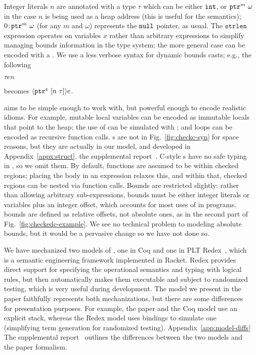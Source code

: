 Integer literals $n$ are annotated with a type $\tau$ which can be either
$\mathtt{int}$, or $\mathtt{ptr}^{m}~{\omega}$ in the case $n$ is being used as
a heap address (this is useful for the semantics);
${0}\!:\!{\mathtt{ptr}^{m}~{\omega}}$ (for any $m$ and $\omega$) represents
the $\mathtt{null}$ pointer, as usual. 
The
$\texttt{strlen}$ expression operates on variables $x$
rather than arbitrary expressions to simplify managing
bounds information in the type system; the more general case can be
encoded with a . We use a less verbose syntax for dynamic bounds
casts; e.g., the following %

$\tau$\code{>>(}$e$$n$\code{))}

\noindent
becomes $\langle{\ensuremath{\mathtt{ptr}^{\texttt{c}}~{[{n}~{\tau}]}}}\rangle{e}$. 

\lang aims to be simple enough to work with, but powerful enough to
encode realistic \checkedc idioms. For example, mutable local
variables can be encoded as immutable locals that point to the heap;
the use of \code{&} can be simulated with ;
and loops can be encoded as recursive function calls. s are
not in Fig.~\ref{fig:checkc-syn} for space reasons, but they are
actually in our model, and developed in
\iftr
Appendix~\ref{appx:struct}.
\else
the supplemental report~\cite{checkedc-tech-report}.
\fi
C-style s have no safe typing
in \checkedc, so we omit them. By default, functions are assumed to
be within checked regions; placing the body in an 
expression relaxes this, and within that, checked regions can be
nested via function calls. Bounds are restricted slightly:
rather than allowing arbitrary sub-expressions, bounds must be either
integer literals or variables plus an integer offset, which accounts
for most uses of  in \checkedc programs. \lang bounds are
defined as relative offsets, not absolute ones, as in the second part
of Fig.~\ref{fig:checkedc-example}. We see no technical problem to
modeling absolute bounds, but it would be a pervasive change so we
have not done so.

  We have mechanized two models of \lang, one in Coq
  and one in PLT Redex~\cite{pltredex}, which is a semantic
  engineering framework implemented in Racket. Redex provides direct
  support for specifying the operational semantics and typing with logical
  rules, but then automatically makes them executable and subject to
  randomized testing, which is very useful during development.
  The model we present in the paper faithfully
  represents both mechanizations, but there are some differences for
  presentation purposes. For example, the paper and the Coq model use an explicit
  stack, whereas the Redex model uses  bindings to simulate
  one (simplifying term generation for randomized
  testing).
\iftr
  Appendix~\ref{app:model-diffs} 
\else
  The supplemental report~\cite{checkedc-tech-report}
\fi
  outlines the differences
  between the two models and the paper formalism.

